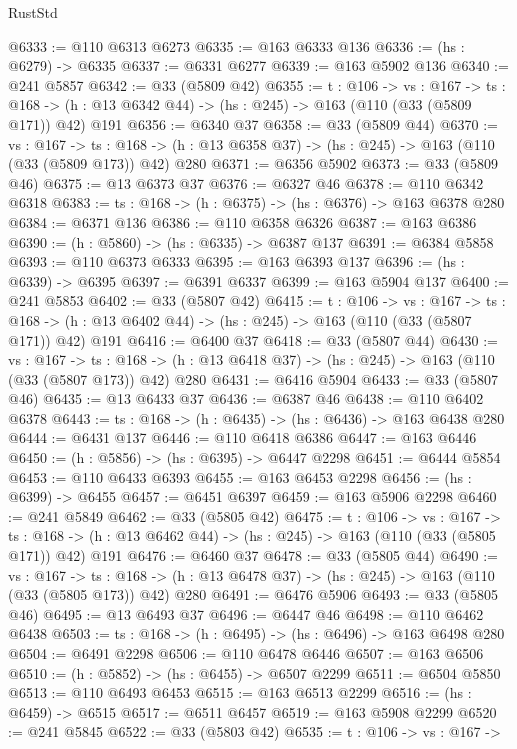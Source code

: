 \begin{lexlean}{RustStd}
\begin{coremodule}
@6333 := @110 @6313 @6273
@6335 := @163 @6333 @136
@6336 := (hs : @6279) -> @6335
@6337 := @6331 @6277
@6339 := @163 @5902 @136
@6340 := @241 @5857
@6342 := @33 (@5809 @42)
@6355 := {t : @106} ->
  {vs : @167} ->
  {ts : @168} -> (h : @13 @6342 @44) -> (hs : @245) -> @163 (@110 (@33 (@5809 @171)) @42) @191
@6356 := @6340 @37
@6358 := @33 (@5809 @44)
@6370 := {vs : @167} ->
  {ts : @168} -> (h : @13 @6358 @37) -> (hs : @245) -> @163 (@110 (@33 (@5809 @173)) @42) @280
@6371 := @6356 @5902
@6373 := @33 (@5809 @46)
@6375 := @13 @6373 @37
@6376 := @6327 @46
@6378 := @110 @6342 @6318
@6383 := {ts : @168} -> (h : @6375) -> (hs : @6376) -> @163 @6378 @280
@6384 := @6371 @136
@6386 := @110 @6358 @6326
@6387 := @163 @6386
@6390 := (h : @5860) -> (hs : @6335) -> @6387 @137
@6391 := @6384 @5858
@6393 := @110 @6373 @6333
@6395 := @163 @6393 @137
@6396 := (hs : @6339) -> @6395
@6397 := @6391 @6337
@6399 := @163 @5904 @137
@6400 := @241 @5853
@6402 := @33 (@5807 @42)
@6415 := {t : @106} ->
  {vs : @167} ->
  {ts : @168} -> (h : @13 @6402 @44) -> (hs : @245) -> @163 (@110 (@33 (@5807 @171)) @42) @191
@6416 := @6400 @37
@6418 := @33 (@5807 @44)
@6430 := {vs : @167} ->
  {ts : @168} -> (h : @13 @6418 @37) -> (hs : @245) -> @163 (@110 (@33 (@5807 @173)) @42) @280
@6431 := @6416 @5904
@6433 := @33 (@5807 @46)
@6435 := @13 @6433 @37
@6436 := @6387 @46
@6438 := @110 @6402 @6378
@6443 := {ts : @168} -> (h : @6435) -> (hs : @6436) -> @163 @6438 @280
@6444 := @6431 @137
@6446 := @110 @6418 @6386
@6447 := @163 @6446
@6450 := (h : @5856) -> (hs : @6395) -> @6447 @2298
@6451 := @6444 @5854
@6453 := @110 @6433 @6393
@6455 := @163 @6453 @2298
@6456 := (hs : @6399) -> @6455
@6457 := @6451 @6397
@6459 := @163 @5906 @2298
@6460 := @241 @5849
@6462 := @33 (@5805 @42)
@6475 := {t : @106} ->
  {vs : @167} ->
  {ts : @168} -> (h : @13 @6462 @44) -> (hs : @245) -> @163 (@110 (@33 (@5805 @171)) @42) @191
@6476 := @6460 @37
@6478 := @33 (@5805 @44)
@6490 := {vs : @167} ->
  {ts : @168} -> (h : @13 @6478 @37) -> (hs : @245) -> @163 (@110 (@33 (@5805 @173)) @42) @280
@6491 := @6476 @5906
@6493 := @33 (@5805 @46)
@6495 := @13 @6493 @37
@6496 := @6447 @46
@6498 := @110 @6462 @6438
@6503 := {ts : @168} -> (h : @6495) -> (hs : @6496) -> @163 @6498 @280
@6504 := @6491 @2298
@6506 := @110 @6478 @6446
@6507 := @163 @6506
@6510 := (h : @5852) -> (hs : @6455) -> @6507 @2299
@6511 := @6504 @5850
@6513 := @110 @6493 @6453
@6515 := @163 @6513 @2299
@6516 := (hs : @6459) -> @6515
@6517 := @6511 @6457
@6519 := @163 @5908 @2299
@6520 := @241 @5845
@6522 := @33 (@5803 @42)
@6535 := {t : @106} ->
  {vs : @167} ->

\end{coremodule}
\end{lexlean}
